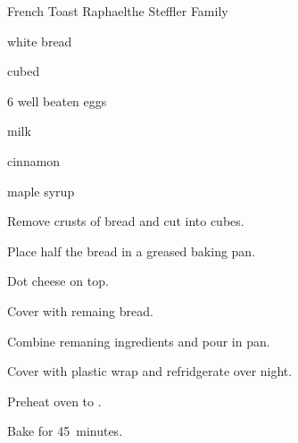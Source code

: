 \begin{recipe}{French Toast Raphael}{the Steffler Family}{}

\begin{ingredients}
\item {} white bread
\item {} cubed 
\item 6 well beaten eggs
\item {} milk
\item \tp{\half} cinnamon
\item \C{\third} maple syrup
\end{ingredients}

\begin{directions}
\item Remove crusts of bread and cut into  cubes.
\item Place half the bread in a greased  baking pan.
\item Dot cheese on top.
\item Cover with remaing bread.
\item Combine remaning ingredients and pour in pan.
\item Cover with plastic wrap and refridgerate over night.
\item Preheat oven to .
\item Bake for 45~minutes.
\end{directions}
\end{recipe}

